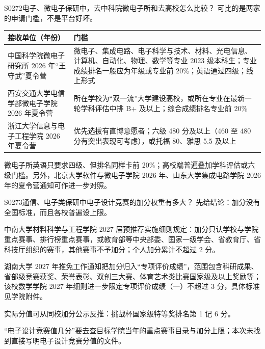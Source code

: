 \begin{qa}{S0272}{电子、微电子保研中，去中科院微电子所和去高校怎么比较？}
可比的是两家的申请门槛，不是平台好坏。

\par\vspace{2pt}\nobreak\begin{center}\footnotesize
\begin{tabularx}{\textwidth}{>{\raggedright\arraybackslash}X>{\raggedright\arraybackslash}X}
\toprule
\textbf{接收单位（年份）} & \textbf{门槛} \\ \midrule
中国科学院微电子研究所 2026 年“王守武”夏令营 & 微电子、集成电路、电子科学与技术、材料、光电信息、计算机、自动化、物理、数学等专业 2023 级本科生；专业成绩排名一般应为年级或专业前 20\%；英语通过四级；线上形式 \\
西安交通大学电信学部微电子学院 2026 年夏令营 & 所在学校为“双一流”大学建设高校，或所在专业在最新一轮学科评估中排 B+ 及以上；综合成绩排名专业前 20\% \\
浙江大学信息与电子工程学院 2026 年夏令营 & 优先选拔有直博意愿者；六级 480 分及以上（460 至 480 分有突出表现可考虑），或托福 80、雅思 5.5 及以上 \\
\bottomrule
\end{tabularx}
\end{center}\vspace{2pt}\par

微电子所英语只要求四级、但排名同样卡前 20\%；高校端普遍叠加学科评估或六级门槛。另外，北京大学软件与微电子学院 2026 年、山东大学集成电路学院 2026 年的夏令营通知可作进一步对照。
\end{qa}

\begin{qa}{S0273}{通信、电子类保研中电子设计竞赛的加分权重有多大？}
先给结论：加分没有全国标准，而且各校普遍设上限。

中南大学材料科学与工程学院 2027 届预推荐实施细则规定：加分只认学校与学院重点赛事、排行榜重点赛事，或教育部等中央部委、国家一级学会、省教育厅、省科技厅组织的赛事，其他赛事不予加分；个人加分累计不超过 2 分。

湖南大学 2027 年推免工作通知把加分归入“专项评价成绩”，范围包含科研成果、省部级竞赛获奖、荣誉表彰、双创三大赛、体育艺术类比赛国家级及以上奖励等；该校数学学院 2027 年细则进一步限定专项评价成绩（一）不超过 3 分，具体标准见学院附件。

实际分值可从同校加分公示反推：挑战杯国家级特等奖排名第 1 记 6 分。

“电子设计竞赛值几分”要去查目标学院当年的重点赛事目录与加分上限；本次未找到直接写明电子设计竞赛分值的文件。
\end{qa}

